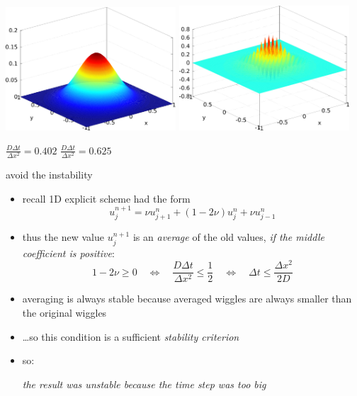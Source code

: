 \documentclass[titlepage,letterpaper,final,12pt]{scrartcl}
\begin{document}
\begin{center}
\includegraphics[width=2.5in]{stability}
\quad
\includegraphics[width=2.5in]{instability}

$\frac{D\Delta t}{\Delta x^2}= 0.402$ \quad
$\frac{D\Delta t}{\Delta x^2}= 0.625$
\end{center}

avoid the instability

\begin{itemize}
\item recall 1D explicit scheme had the form 
	$$u_j^{n+1} = \nu u_{j+1}^n + (1 - 2 \nu) u_j^n + \nu u_{j-1}^n$$
\item thus the new value $u_j^{n+1}$ is an \emph{average} of the old values, \emph{if the middle coefficient is positive}:
	$$1 - 2 \nu \ge 0 \quad \iff \quad  \frac{D\Delta t}{\Delta x^2} \le \frac{1}{2} \quad \iff \quad \Delta t \le \frac{\Delta x^2}{2 D}$$
\item averaging is always stable because averaged wiggles are always smaller than the original wiggles
\item \dots so this condition is a sufficient \emph{stability criterion}
\item so:

\begin{center}
\emph{the result was unstable because the time step was too big}
\end{center}
\end{itemize}
\end{document}
